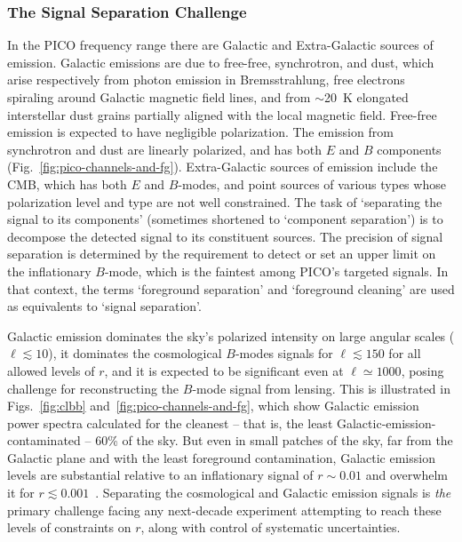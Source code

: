 \documentclass[PICOReport.tex]{subfiles}
\begin{document}

\subsubsection{The Signal Separation Challenge}
\label{sec:separation_challenge}

In the PICO frequency range there are Galactic and Extra-Galactic sources of emission. Galactic emissions are due to free-free, synchrotron, and dust, which arise respectively from photon emission in Bremsstrahlung, free electrons spiraling around Galactic magnetic field lines, and from $\sim$20~K elongated interstellar dust grains partially aligned with the local magnetic field. Free-free emission is expected to have negligible polarization. The emission from synchrotron and dust are linearly polarized, and has both $E$ and $B$ components (Fig.~\ref{fig:pico-channels-and-fg}).  Extra-Galactic sources of emission include the CMB, which has both $E$ and $B$-modes, and point sources of various types whose polarization level and type are not well constrained. The task of `separating the signal to its components' (sometimes shortened to `component separation') is to decompose the detected signal to its constituent sources. The precision of signal separation is determined by the requirement to detect or set an upper limit on the inflationary $B$-mode, which is the faintest among PICO's targeted signals. In that context, the terms `foreground separation' and `foreground cleaning' are used as equivalents to `signal separation'. 

Galactic emission dominates the sky's polarized intensity on large angular scales ($\ell \lesssim 10$), it dominates the cosmological $B$-modes signals for $\ell \lesssim 150$ for all allowed levels of $r$, and it is expected to be significant even at $\ell \simeq 1000$, posing challenge for reconstructing the $B$-mode signal from lensing. This is illustrated in Figs.~\ref{fig:clbb} and~\ref{fig:pico-channels-and-fg}, which show Galactic emission power spectra calculated for the cleanest -- that is, the least Galactic-emission-contaminated -- 60\% of the sky. But even in small patches of the sky, far from the Galactic plane and with the least foreground contamination, Galactic emission levels are substantial relative to an inflationary signal of $r \sim 0.01$ and overwhelm it for $r \lesssim 0.001$~\cite{planckEB}. Separating the cosmological and Galactic emission signals is {\it the} primary challenge facing any next-decade experiment attempting to reach these levels of constraints on $r$, along with control of systematic uncertainties.
\end{document}
